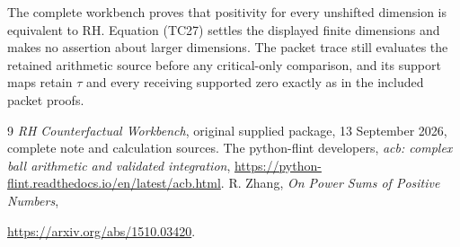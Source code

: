The complete workbench proves that positivity for every
unshifted dimension is equivalent to RH. Equation (TC27)
settles the displayed finite dimensions and makes no assertion
about larger dimensions. The packet trace still evaluates
the retained arithmetic source before any critical-only
comparison, and its support maps retain $\tau$ and every
receiving supported zero exactly as in the included packet
proofs.

\begin{thebibliography}{9}
\emph{RH Counterfactual Workbench}, original supplied package,
13 September 2026, complete note and calculation sources.
The python-flint developers,
\emph{acb: complex ball arithmetic and validated integration},
\url{https://python-flint.readthedocs.io/en/latest/acb.html}.
R. Zhang, \emph{On Power Sums of Positive Numbers},\par
\url{https://arxiv.org/abs/1510.03420}.
\end{thebibliography}
